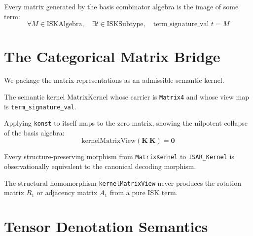 \begin{theorem}
Every matrix generated by the basis combinator algebra is the image of some term:
$$\forall M \in \text{ISKAlgebra}, \quad \exists t \in \text{ISKSubtype}, \quad \text{term\_signature\_val } t = M$$
\end{theorem}

\section{The Categorical Matrix Bridge}

We package the matrix representations as an admissible semantic kernel.

\begin{definition}
The semantic kernel MatrixKernel whose carrier is \texttt{Matrix4} and whose view map is \texttt{term\_signature\_val}.
\end{definition}

\begin{theorem}
Applying \texttt{konst} to itself maps to the zero matrix, showing the nilpotent collapse of the basis algebra:
$$\text{kernelMatrixView}(\mathbf{K}\ \mathbf{K}) = \mathbf{0}$$
\end{theorem}

\begin{theorem}
Every structure-preserving morphism from \texttt{MatrixKernel} to \texttt{ISAR\_Kernel} is observationally equivalent to the canonical decoding morphism.
\end{theorem}

\begin{theorem}
The structural homomorphism \texttt{kernelMatrixView} never produces the rotation matrix $R_1$ or adjacency matrix $A_1$ from a pure ISK term.
\end{theorem}

\section{Tensor Denotation Semantics}

